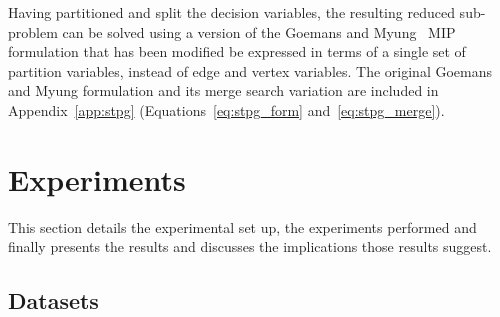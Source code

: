 \documentclass[journal]{IEEEtran}
\begin{document}
Having partitioned and split the decision variables, the resulting reduced sub-problem can be solved using a version of the Goemans and Myung~\cite{goemans} MIP formulation that has been modified be expressed in terms of a single set of partition variables, instead of edge and vertex variables. The original Goemans and Myung formulation and its merge search variation are included in Appendix~\ref{app:stpg} (Equations~\ref{eq:stpg_form} and~\ref{eq:stpg_merge}).


\section{Experiments}\label{sec:exper}
This section details the experimental set up, the experiments performed and finally presents the results and discusses the implications those results suggest.
\subsection{Datasets}
\end{document}
